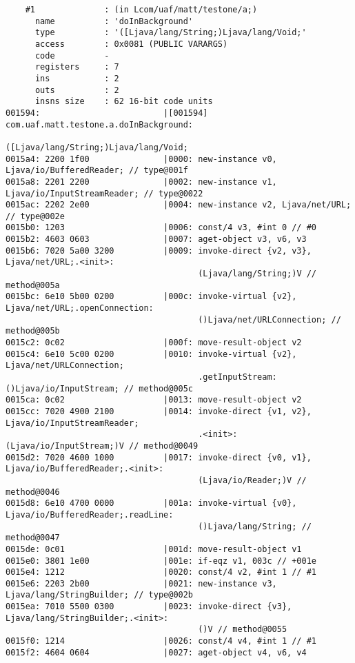 \begin{lstlisting}
    #1              : (in Lcom/uaf/matt/testone/a;)
      name          : 'doInBackground'
      type          : '([Ljava/lang/String;)Ljava/lang/Void;'
      access        : 0x0081 (PUBLIC VARARGS)
      code          -
      registers     : 7
      ins           : 2
      outs          : 2
      insns size    : 62 16-bit code units
001594:                         |[001594] com.uaf.matt.testone.a.doInBackground:
                                          ([Ljava/lang/String;)Ljava/lang/Void;
0015a4: 2200 1f00               |0000: new-instance v0, Ljava/io/BufferedReader; // type@001f
0015a8: 2201 2200               |0002: new-instance v1, Ljava/io/InputStreamReader; // type@0022
0015ac: 2202 2e00               |0004: new-instance v2, Ljava/net/URL; // type@002e
0015b0: 1203                    |0006: const/4 v3, #int 0 // #0
0015b2: 4603 0603               |0007: aget-object v3, v6, v3
0015b6: 7020 5a00 3200          |0009: invoke-direct {v2, v3}, Ljava/net/URL;.<init>:
                                       (Ljava/lang/String;)V // method@005a
0015bc: 6e10 5b00 0200          |000c: invoke-virtual {v2}, Ljava/net/URL;.openConnection:
                                       ()Ljava/net/URLConnection; // method@005b
0015c2: 0c02                    |000f: move-result-object v2
0015c4: 6e10 5c00 0200          |0010: invoke-virtual {v2}, Ljava/net/URLConnection;
                                       .getInputStream:()Ljava/io/InputStream; // method@005c
0015ca: 0c02                    |0013: move-result-object v2
0015cc: 7020 4900 2100          |0014: invoke-direct {v1, v2}, Ljava/io/InputStreamReader;
                                       .<init>:(Ljava/io/InputStream;)V // method@0049
0015d2: 7020 4600 1000          |0017: invoke-direct {v0, v1}, Ljava/io/BufferedReader;.<init>:
                                       (Ljava/io/Reader;)V // method@0046
0015d8: 6e10 4700 0000          |001a: invoke-virtual {v0}, Ljava/io/BufferedReader;.readLine:
                                       ()Ljava/lang/String; // method@0047
0015de: 0c01                    |001d: move-result-object v1
0015e0: 3801 1e00               |001e: if-eqz v1, 003c // +001e
0015e4: 1212                    |0020: const/4 v2, #int 1 // #1
0015e6: 2203 2b00               |0021: new-instance v3, Ljava/lang/StringBuilder; // type@002b
0015ea: 7010 5500 0300          |0023: invoke-direct {v3}, Ljava/lang/StringBuilder;.<init>:
                                       ()V // method@0055
0015f0: 1214                    |0026: const/4 v4, #int 1 // #1
0015f2: 4604 0604               |0027: aget-object v4, v6, v4

\end{lstlisting}
